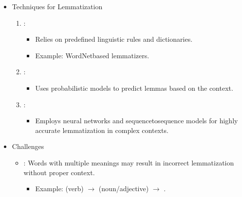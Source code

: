 \documentclass[letterpaper,11pt,english]{sphinxmanual}
\begin{document}
\begin{itemize}
\begin{itemize}
\begin{itemize}
\item {} 
\sphinxAtStartPar
May produce non\sphinxhyphen{}dictionary forms.

\item {} 
\sphinxAtStartPar
Example:
\sphinxhyphen{}  \(\rightarrow\) .

\end{itemize}

\end{itemize}

\item {} 
\sphinxAtStartPar
Techniques for Lemmatization
\begin{enumerate}
%
\item {} 
\sphinxAtStartPar
{}:
\begin{itemize}
\item {} 
\sphinxAtStartPar
Relies on predefined linguistic rules and dictionaries.

\item {} 
\sphinxAtStartPar
Example: WordNet\sphinxhyphen{}based lemmatizers.

\end{itemize}

\item {} 
\sphinxAtStartPar
{}:
\begin{itemize}
\item {} 
\sphinxAtStartPar
Uses probabilistic models to predict lemmas based on the context.

\end{itemize}

\item {} 
\sphinxAtStartPar
{}:
\begin{itemize}
\item {} 
\sphinxAtStartPar
Employs neural networks and sequence\sphinxhyphen{}to\sphinxhyphen{}sequence models for highly accurate lemmatization in complex contexts.

\end{itemize}

\end{enumerate}

\item {} 
\sphinxAtStartPar
Challenges
\begin{itemize}
\item {} 
\sphinxAtStartPar
{}:
Words with multiple meanings may result in incorrect lemmatization without proper context.
\begin{itemize}
\item {} 
\sphinxAtStartPar
Example:
\sphinxhyphen{}  (verb) \(\rightarrow\) 
\sphinxhyphen{}  (noun/adjective) \(\rightarrow\) .


\end{itemize}
\end{itemize}
\end{itemize}
\end{document}

